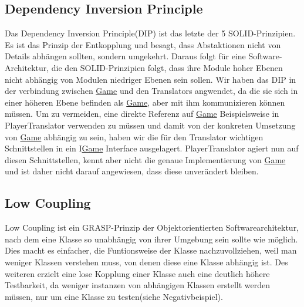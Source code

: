 \documentclass[
10pt, %
a4paper, %
oneside, %
headinclude,footinclude, %
BCOR5mm, %
]{scrartcl}
\begin{document}
\begin{onehalfspace}
\subsection{Dependency Inversion Principle}
\label{sec:depin}
Das Dependency Inversion Principle(DIP) ist das letzte der 5 SOLID-Prinzipien. Es ist das Prinzip der Entkopplung und besagt, dass Abstaktionen nicht von Details abhängen sollten, sondern umgekehrt. Daraus folgt für eine Software-Architektur, die den SOLID-Prinzipien folgt, dass ihre Module hoher Ebenen nicht abhängig von Modulen niedriger Ebenen sein sollen.
Wir haben das DIP in der verbindung zwischen \href{https://github.com/schmida736/Chess-AdvancedSE/blob/main/Chess-AdvancedSE/Game\%20Elements/Game.cs}{Game} und den Translators angwendet, da die sie sich in einer höheren Ebene befinden als \href{https://github.com/schmida736/Chess-AdvancedSE/blob/main/Chess-AdvancedSE/Game\%20Elements/Game.cs}{Game}, aber mit ihm kommunizieren können müssen.
Um zu vermeiden, eine direkte Referenz auf \href{https://github.com/schmida736/Chess-AdvancedSE/blob/main/Chess-AdvancedSE/Game\%20Elements/Game.cs}{Game} Beispielsweise in PlayerTranslator verwenden zu müssen und damit von der konkreten Umsetzung von \href{https://github.com/schmida736/Chess-AdvancedSE/blob/main/Chess-AdvancedSE/Game\%20Elements/Game.cs}{Game} abhängig zu sein, haben wir die für den Translator wichtigen Schnittstellen in ein I\href{https://github.com/schmida736/Chess-AdvancedSE/blob/main/Chess-AdvancedSE/Game\%20Elements/Game.cs}{Game} Interface ausgelagert. PlayerTranslator agiert nun auf diesen Schnittstellen, kennt aber nicht die genaue Implementierung von \href{https://github.com/schmida736/Chess-AdvancedSE/blob/main/Chess-AdvancedSE/Game\%20Elements/Game.cs}{Game} und ist daher nicht darauf angewiesen, dass diese unverändert bleiben.
\subsection{Low Coupling}
Low Coupling ist ein GRASP-Prinzip der Objektorientierten Softwarearchitektur, nach dem eine Klasse so unabhängig von ihrer Umgebung sein sollte wie möglich. Dies macht es einfacher, die Funtionsweise der Klasse nachzuvollziehen, weil man weniger Klassen verstehen muss, von denen diese eine Klasse abhängig ist. Des weiteren erzielt eine lose Kopplung einer Klasse auch eine deutlich höhere Testbarkeit, da weniger instanzen von abhängigen Klassen erstellt werden müssen, nur um eine Klasse zu testen(siehe Negativbeispiel).


\end{onehalfspace}
\end{document}
